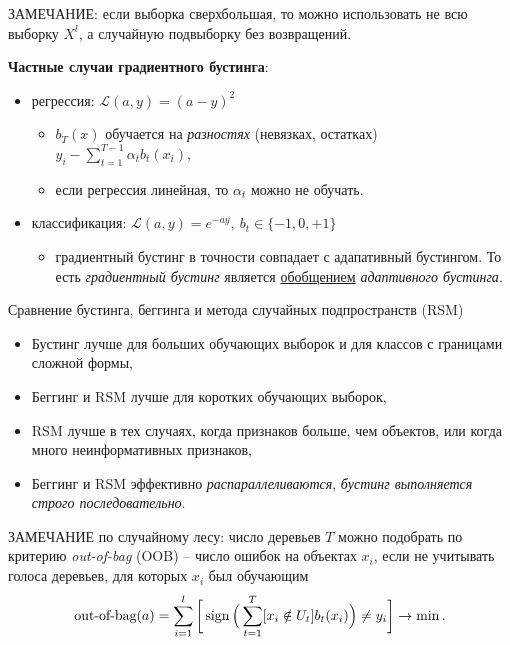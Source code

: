 \documentclass[%
	11pt,
	a4paper,
	utf8,
		]{article}
\begin{document}
ЗАМЕЧАНИЕ: если выборка сверхбольшая, то можно использовать не всю выборку $ X^l $, а случайную подвыборку без возвращений.

\textbf{Частные случаи градиентного бустинга}:
\begin{itemize}
	\item регрессия: $ \mathcal{L}(a, y) = (a - y)^2 $
	\begin{itemize}
		\item $ b_T(x) $ обучается на \emph{разностях} (невязках, остатках) $ y_i - \sum_{t = 1}^{T - 1} \alpha_t b_t(x_i) $,
		
		\item если регрессия линейная, то $ \alpha_t $ можно не обучать.
	\end{itemize}
    
    \item классификация: $ \mathcal{L}(a, y) = e^{-a y}, \ b_t \in \{ -1, 0, +1 \} $
    \begin{itemize}
    	\item градиентный бустинг в точности совпадает с адапативный бустингом. То есть \emph{градиентный бустинг} является \underline{обобщением} \emph{адаптивного бустинга}.
    \end{itemize}
\end{itemize} 

Сравнение бустинга, беггинга и метода случайных подпространств (RSM)
\begin{itemize}
	\item Бустинг лучше для больших обучающих выборок и для классов с границами сложной формы,
	
	\item Беггинг и RSM лучше для коротких обучающих выборок,
	
	\item RSM лучше в тех случаях, когда признаков больше, чем объектов, или когда много неинформативных признаков,
	
	\item Беггинг и RSM эффективно \emph{распараллеливаются}, \emph{\color{blue}бустинг выполняется строго последовательно}.
\end{itemize}

ЗАМЕЧАНИЕ по случайному лесу: число деревьев $ T $ можно подобрать по критерию \emph{out-of-bag} (OOB) -- число ошибок на объектах $ x_i $, если не учитывать голоса деревьев, для которых $ x_i $ был обучающим
\begin{align*}
	\text{out-of-bag}(a) = \sum_{i=1}^{l} \bigg[ \operatorname*{sign} \Big( \sum_{t=1}^{T} [x_i \notin U_t]b_t(x_i) \Big) \neq y_i \bigg] \to \min.
\end{align*}
\end{document}
